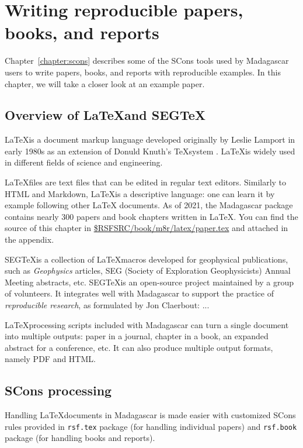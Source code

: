 \chapter{Writing reproducible papers, books, and reports}

Chapter~\ref{chapter:scons} describes some of the SCons tools used by
Madagascar users to write papers, books, and reports with reproducible
examples. In this chapter, we will take a closer look at an example paper.

\section{Overview of \LaTeX and SEG\TeX}

\LaTeX is a document markup language developed originally by Leslie
Lamport in early 1980s \cite[]{latex} as an extension of Donuld
Knuth's \TeX system \cite[]{tex}. \LaTeX is widely used in different
fields of science and engineering.

\LaTeX files are text files that can be edited in regular text
editors. Similarly to HTML and Markdown, \LaTeX is a descriptive
language: one can learn it by example following other \LaTeX
documents. As of 2021, the Madagascar package contains nearly 300
papers and book chapters written in \LaTeX. You can find the source of
this chapter in
\href{https://github.com/ahay/src/blob/master/book/m8r/latex/paper.tex}
     {\$RSFSRC/book/m8r/latex/paper.tex}
and attached in the appendix.

SEG\TeX is a collection of \LaTeX macros developed for geophysical
publications, such as \emph{Geophysics} articles, SEG (Society of
Exploration Geophysicists) Annual Meeting abstracts, etc. SEG\TeX is
an open-source project maintained by a group of volunteers. It
integrates well with Madagascar to support the practice of
\emph{reproducible research}, as formulated by Jon Claerbout: ...

\LaTeX processing scripts included with Madagascar can turn a single
document into multiple outputs: paper in a journal, chapter in a book,
an expanded abstract for a conference, etc. It can also produce
multiple output formats, namely PDF and HTML.

\section{SCons processing}

Handling \LaTeX documents in Madagascar is made easier with customized
SCons rules provided in \texttt{rsf.tex} package (for handling
individual papers) and \texttt{rsf.book} package (for handling books
and reports).

